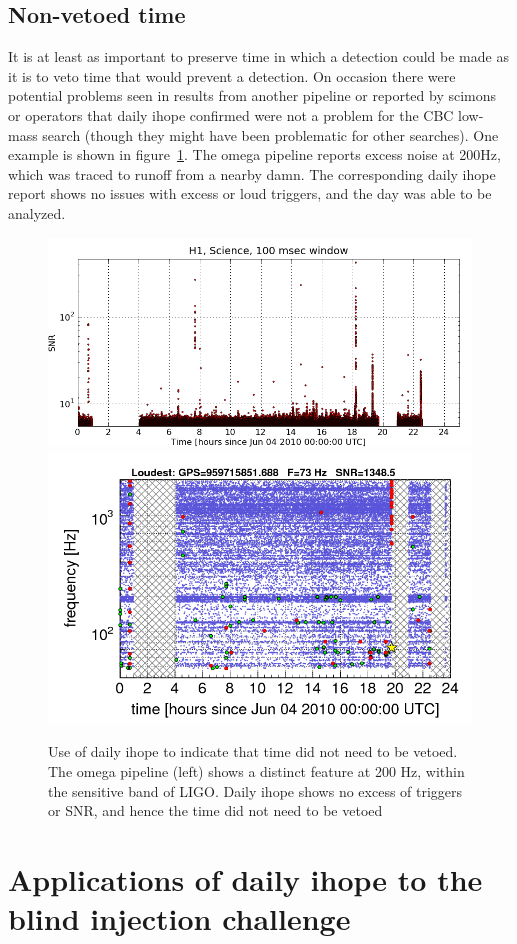\subsection{Non-vetoed time}

It is at least as important to preserve time in which a detection
could be made as it is to veto time that would prevent a detection.
On occasion there were potential problems seen in results from
another pipeline or reported by scimons or operators that daily ihope
confirmed were not a problem for the CBC low-mass search (though they
might have been problematic for other searches).  One example is shown
in figure~\ref{f:non_vetoed_time}.  The omega pipeline reports excess
noise at 200Hz, which was traced to runoff from a nearby damn.  The
corresponding daily ihope report shows no issues with excess or loud
triggers, and the day was able to be analyzed.

\begin{figure}
  \includegraphics[width=0.5\linewidth]{figures/detchar/20100604_H1_0_100MILLISEC_CLUSTERED_snr_vs_time}
  \includegraphics[width=0.5\linewidth]{figures/detchar/S6-H1-omega-959644815-959731215-GlitchTS}
  \caption[Use of daily ihope to indicate no veto needed] {
  \label{f:non_vetoed_time}
Use of daily ihope to indicate that time did not need to be vetoed.
The omega pipeline (left) shows a distinct feature at 200 Hz, within
the sensitive band of LIGO.  Daily ihope shows no excess of triggers
or SNR, and hence the time did not need to be vetoed}
\end{figure}%


\section{Applications of daily ihope to the blind injection challenge}
\label{sec:applications_vetoes}


